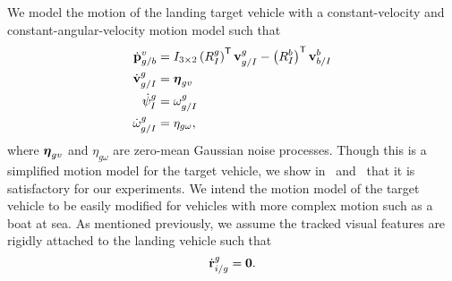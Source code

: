 We model the motion of the landing target vehicle
with a constant-velocity and constant-angular-velocity motion model such that
\begin{align}
  \dot{\vect{p}}_{g/b}^{v} &= I_{3 \times 2} \left( R_{I}^{g} \right)^\transpose
   \vect{v}_{g/I}^{g} - \left( R_{I}^{b} \right)^\transpose
  \vect{v}_{b/I}^{b} \label{eq:goal_dynamics} \\
  \dot{\vect{v}}_{g/I}^{g} &= \vect{\eta}_{gv} \nonumber \\
  \dot{\psi}_{I}^{g} &= \omega_{g/I}^g \nonumber \\
  \dot{\omega}_{g/I}^{g} &= \eta_{g\omega}, \nonumber
\end{align}
where $\boldsymbol{\mathrm{\eta}}_{gv}$ and $\eta_{g\omega}$ are zero-mean Gaussian noise
processes. Though this is a simplified motion model for the target
vehicle, we show in~
and~ that it is
satisfactory for our experiments. We intend the motion model of the target
vehicle to be easily modified for vehicles with more complex motion such
as a boat at sea.
As mentioned previously, we assume the tracked visual features are rigidly
attached to the landing vehicle such that
\begin{equation}
  \dot{\vect{r}}_{i/g}^g = \vect{0}. \label{eq:feature_dynamics}
\end{equation}

